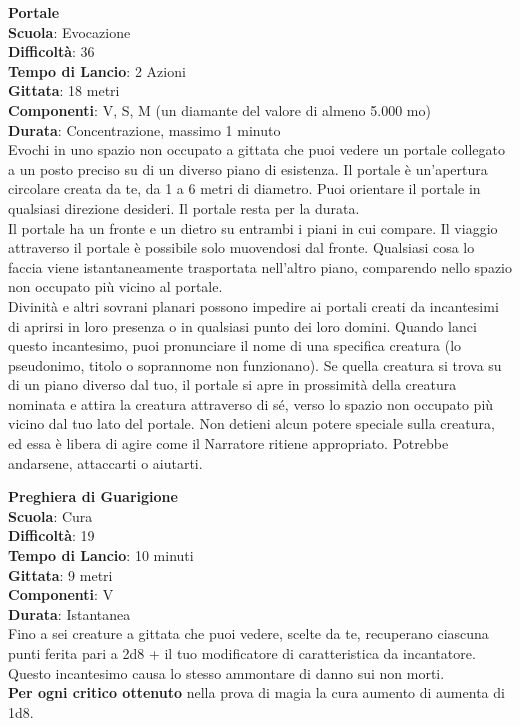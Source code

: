 \begin{multicols}{2}
\medskip\textbf{Portale}\\
\textbf{Scuola}: Evocazione\\
\textbf{Difficoltà}: 36\\
\textbf{Tempo di Lancio}: 2 Azioni\\
\textbf{Gittata}: 18 metri\\
\textbf{Componenti}: V, S, M (un diamante del valore di almeno 5.000 mo)\\
\textbf{Durata}: Concentrazione, massimo 1 minuto\\
Evochi in uno spazio non occupato a gittata che puoi vedere un portale collegato a un posto preciso su di un diverso piano di esistenza. Il portale è un'apertura circolare creata da te, da 1 a 6 metri di diametro. Puoi orientare il portale in qualsiasi direzione desideri. Il portale resta per la durata.\\
Il portale ha un fronte e un dietro su entrambi i piani in cui compare. Il viaggio attraverso il portale è possibile solo muovendosi dal fronte. Qualsiasi cosa lo faccia viene istantaneamente trasportata nell'altro piano, comparendo nello spazio non occupato più vicino al portale.\\
Divinità e altri sovrani planari possono impedire ai portali creati da incantesimi di aprirsi in loro presenza o in qualsiasi punto dei loro domini. Quando lanci questo incantesimo, puoi pronunciare il nome di una specifica creatura (lo pseudonimo, titolo o soprannome non funzionano). Se quella creatura si trova su di un piano diverso dal tuo, il portale si apre in prossimità della creatura nominata e attira la creatura attraverso di sé, verso lo spazio non occupato più vicino dal tuo lato del portale. Non detieni alcun potere speciale sulla creatura, ed essa è libera di agire come il Narratore ritiene appropriato. Potrebbe andarsene, attaccarti o aiutarti.

\medskip\textbf{Preghiera di Guarigione}\\
\textbf{Scuola}: Cura\\
\textbf{Difficoltà}: 19\\
\textbf{Tempo di Lancio}: 10 minuti\\
\textbf{Gittata}: 9 metri\\
\textbf{Componenti}: V\\
\textbf{Durata}: Istantanea\\
Fino a sei creature a gittata che puoi vedere, scelte da te, recuperano ciascuna punti ferita pari a 2d8 + il tuo modificatore di caratteristica da incantatore. Questo incantesimo causa lo stesso ammontare di danno sui non morti.\\
\textbf{Per ogni critico ottenuto} nella prova di magia la cura aumento di aumenta di 1d8.


\end{multicols}
